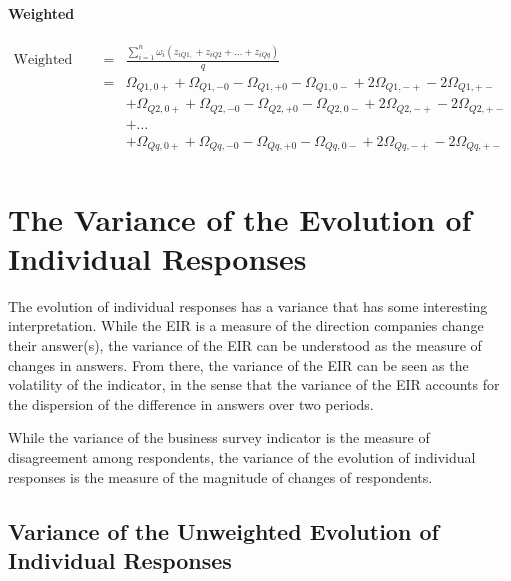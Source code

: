 \documentclass[12pt,a4paper,oneside]{book}
\begin{document}
\subsubsection{Weighted}


\begin{eqnarray}
    \mbox{Weighted EIR}\ &=& \frac{ \sum_{i=1}^n \omega_i \left(z_{i Q1,} + z_{i Q2} + \ldots + z_{i Qq} \right)}{q} \nonumber \\
&=&    \Omega_{Q1,0+} + \Omega_{Q1,-0} - \Omega_{Q1,+0} - \Omega_{Q1,0-} +2 \Omega_{Q1,-+} -2\Omega_{Q1,+-} \nonumber \\
&&    + \Omega_{Q2,0+} + \Omega_{Q2,-0} - \Omega_{Q2,+0} - \Omega_{Q2,0-} +2 \Omega_{Q2,-+} -2\Omega_{Q2,+-} \nonumber \\
&&	 + \ldots \nonumber \\
&&   + \Omega_{Qq,0+} + \Omega_{Qq,-0} - \Omega_{Qq,+0} - \Omega_{Qq,0-} +2 \Omega_{Qq,-+} -2\Omega_{Qq,+-} \nonumber \\
\end{eqnarray}




\chapter{The Variance of the Evolution of Individual Responses} \label{Chapter:Var Z}

The evolution of individual responses has a variance that has some  interesting interpretation.
While the EIR is a measure of the direction companies change their answer(s), the variance of the EIR can be understood as the measure of changes in answers.
From there, the variance of the EIR can be seen as the volatility of the indicator, in the sense that the variance of the EIR accounts for the dispersion of the difference in answers over two periods.

While the variance of the business survey indicator is the measure of disagreement among respondents, the variance of the evolution of individual responses is the measure of the magnitude of changes of respondents.


\section{Variance of the Unweighted Evolution of Individual Responses}
\end{document}
